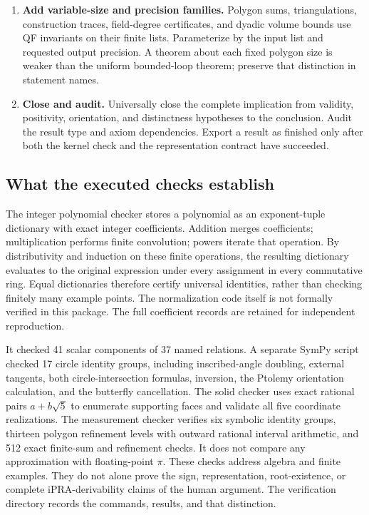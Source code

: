 \begin{enumerate}
For angles retain the upper-semicircle branch data. For Ptolemy retain
the four boundary-order signs as well as concyclicity.
\item \textbf{Add variable-size and precision families.} Polygon sums,
triangulations, construction traces, field-degree certificates, and dyadic
volume bounds use QF invariants on their finite lists. Parameterize by
the input list and requested output precision. A theorem about each fixed
polygon size is weaker than the uniform bounded-loop theorem; preserve
that distinction in statement names.
\item \textbf{Close and audit.} Universally close the complete implication
from validity, positivity, orientation, and distinctness hypotheses to
the conclusion. Audit the result type and axiom dependencies. Export a
result as finished only after both the kernel check and the representation
contract have succeeded.
\end{enumerate}

\subsection{What the executed checks establish}
The integer polynomial checker stores a polynomial as an exponent-tuple
dictionary with exact integer coefficients. Addition merges coefficients;
multiplication performs finite convolution; powers iterate that operation.
By distributivity and induction on these finite operations, the resulting
dictionary evaluates to the original expression under every assignment in
every commutative ring. Equal dictionaries therefore certify universal
identities, rather than checking finitely many example points.
The normalization code itself is not formally verified in this package.
The full coefficient records are retained for independent reproduction.

It checked 41 scalar components of 37 named relations. A separate SymPy
script checked 17 circle identity groups, including inscribed-angle
doubling, external tangents, both circle-intersection formulas, inversion,
the Ptolemy orientation calculation, and the butterfly cancellation.
The solid checker uses exact rational pairs $a+b\sqrt5$ to enumerate
supporting faces and validate all five coordinate realizations.
The measurement checker verifies six symbolic identity groups, thirteen
polygon refinement levels with outward rational interval arithmetic, and
512 exact finite-sum and refinement checks. It does not compare any
approximation with floating-point $\pi$.
These checks address algebra and finite examples. They do not alone prove
the sign, representation, root-existence, or complete iPRA-derivability
claims of the human argument. The verification directory records the
commands, results, and that distinction.
